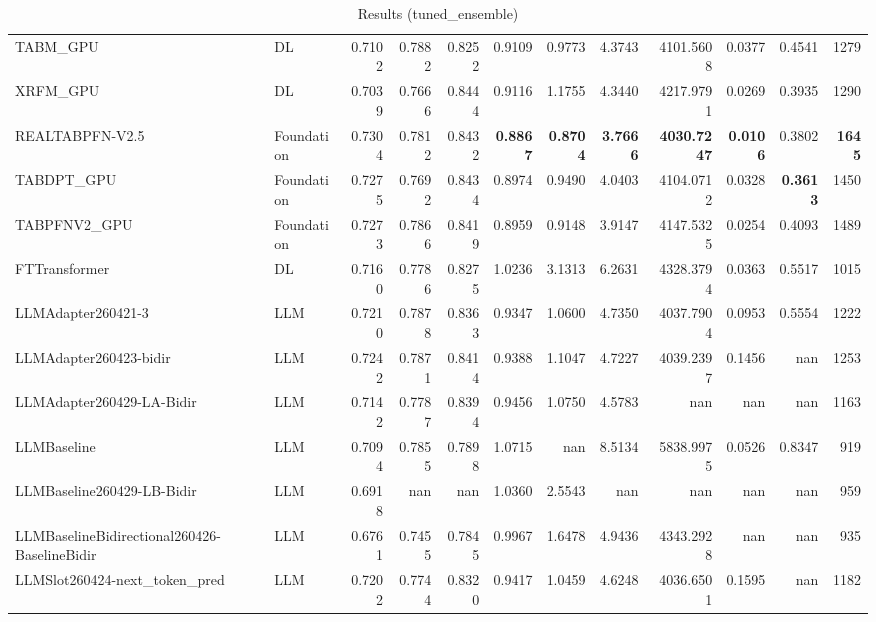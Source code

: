 \begin{table}[htbp]
{\begin{tabular}{ll|rrrrrrrrr|r}
TABM\_GPU & DL & 0.7102 & 0.7882 & 0.8252 & 0.9109 & 0.9773 & 4.3743 & 4101.5608 & 0.0377 & 0.4541 & 1279 \\
XRFM\_GPU & DL & 0.7039 & 0.7666 & 0.8444 & 0.9116 & 1.1755 & 4.3440 & 4217.9791 & 0.0269 & 0.3935 & 1290 \\
REALTABPFN-V2.5 & Foundation & 0.7304 & 0.7812 & 0.8432 & \textbf{0.8867} & \textbf{0.8704} & \textbf{3.7666} & \textbf{4030.7247} & \textbf{0.0106} & 0.3802 & \textbf{1645} \\
TABDPT\_GPU & Foundation & 0.7275 & 0.7692 & 0.8434 & 0.8974 & 0.9490 & 4.0403 & 4104.0712 & 0.0328 & \textbf{0.3613} & 1450 \\
TABPFNV2\_GPU & Foundation & 0.7273 & 0.7866 & 0.8419 & 0.8959 & 0.9148 & 3.9147 & 4147.5325 & 0.0254 & 0.4093 & 1489 \\
\midrule
FTTransformer & DL & 0.7160 & 0.7786 & 0.8275 & 1.0236 & 3.1313 & 6.2631 & 4328.3794 & 0.0363 & 0.5517 & 1015 \\
LLMAdapter260421-3 & LLM & 0.7210 & 0.7878 & 0.8363 & 0.9347 & 1.0600 & 4.7350 & 4037.7904 & 0.0953 & 0.5554 & 1222 \\
LLMAdapter260423-bidir & LLM & 0.7242 & 0.7871 & 0.8414 & 0.9388 & 1.1047 & 4.7227 & 4039.2397 & 0.1456 & nan & 1253 \\
LLMAdapter260429-LA-Bidir & LLM & 0.7142 & 0.7787 & 0.8394 & 0.9456 & 1.0750 & 4.5783 & nan & nan & nan & 1163 \\
LLMBaseline & LLM & 0.7094 & 0.7855 & 0.7898 & 1.0715 & nan & 8.5134 & 5838.9975 & 0.0526 & 0.8347 & 919 \\
LLMBaseline260429-LB-Bidir & LLM & 0.6918 & nan & nan & 1.0360 & 2.5543 & nan & nan & nan & nan & 959 \\
LLMBaselineBidirectional260426-BaselineBidir & LLM & 0.6761 & 0.7455 & 0.7845 & 0.9967 & 1.6478 & 4.9436 & 4343.2928 & nan & nan & 935 \\
LLMSlot260424-next\_token\_pred & LLM & 0.7202 & 0.7744 & 0.8320 & 0.9417 & 1.0459 & 4.6248 & 4036.6501 & 0.1595 & nan & 1182 \\
\bottomrule
\end{tabular}
}
\caption{Results (tuned_ensemble)}
\label{tab:results_tuned_ensemble}
\end{table}